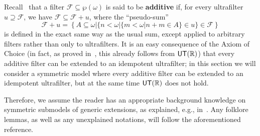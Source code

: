 \documentclass[10pt]{amsart}
\newcommand{\utr}{\mathnormal{\mathsf{UT}(\mathbb R)}}
\theoremstyle{definition}
\theoremstyle{remark}
\begin{document}
Recall~\cite[Def. 2.1]{dinasso-tachtsis} that a filter $\mathscr F\subseteq\wp(\omega)$ is said to be {\bf additive} if, for every ultrafilter $u\supseteq\mathscr F$, we have $\mathscr F\subseteq\mathscr F+u$, where the ``pseudo-sum''
\begin{equation*}
    \mathscr F+u=\left\{A\subseteq\omega\big| \{n<\omega\big|\{m<\omega\big|n+m\in A\}\in u\}\in\mathscr F\right\}
\end{equation*}
is defined in the exact same way as the usual sum, except applied to arbitrary filters rather than only to ultrafilters. It is an easy consequence of the Axiom of Choice (in fact, as proved in~\cite[Thm. 3.6]{dinasso-tachtsis}, this already follows from $\utr$) that every additive filter can be extended to an idempotent ultrafilter; in this section we will consider a symmetric model where every additive filter can be extended to an idempotent ultrafilter, but at the same time $\utr$ does not hold.

Therefore, we assume the reader has an appropriate background knowledge on symmetric submodels of generic extensions, as explained, e.g., in~\cite[Ch. 17]{halbeisen}. Any folklore lemmas, as well as any unexplained notations, will follow the aforementioned reference. 
\end{document}
